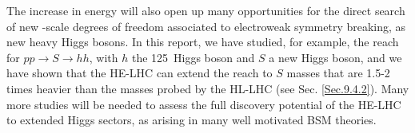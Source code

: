 \documentclass[../report.tex]{subfiles}
\begin{document}
The increase in energy will also open up many opportunities for the direct search of new \UTeV-scale degrees of freedom associated to electroweak symmetry breaking, as new heavy Higgs bosons. In this report, we have studied, for example, the reach for $pp \rightarrow S \rightarrow hh$, with $h$ the 125~\UGeV Higgs boson and $S$ a new Higgs boson, and we have shown that the HE-LHC can extend the reach to $S$ masses that are 1.5-2 times heavier than the masses probed by the HL-LHC (see Sec. \ref{Sec.9.4.2}). Many more studies will be needed to assess the full discovery potential of the HE-LHC to extended Higgs sectors, as arising in many well motivated BSM theories.
\end{document}
